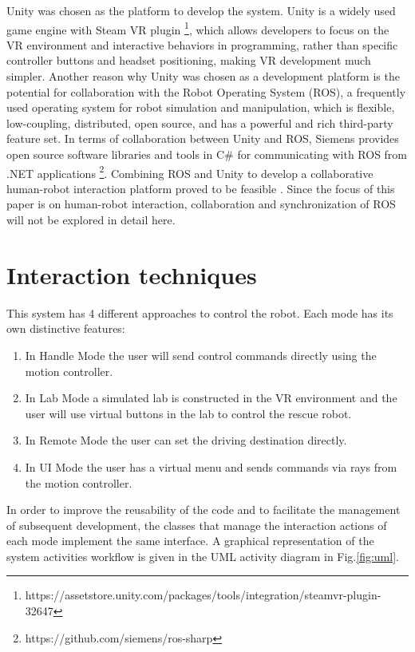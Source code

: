 Unity was chosen as the platform to develop the system. Unity is a widely used game engine with Steam VR plugin \footnote{https://assetstore.unity.com/packages/tools/integration/steamvr-plugin-32647}, which allows developers to focus on the VR environment and interactive behaviors in programming, rather than specific controller buttons and headset positioning, making VR development much simpler. Another reason why Unity was chosen as a development platform is the potential for collaboration with the Robot Operating System (ROS), a frequently used operating system for robot simulation and manipulation, which is flexible, low-coupling, distributed, open source, and has a powerful and rich third-party feature set. In terms of collaboration between Unity and ROS, Siemens provides open source software libraries and tools in C\# for communicating with ROS from .NET applications \footnote{https://github.com/siemens/ros-sharp}. Combining ROS and Unity to develop a collaborative human-robot interaction platform proved to be feasible \cite{Whitney:2018wk}. Since the focus of this paper is on human-robot interaction, collaboration and synchronization of ROS will not be explored in detail here.


\section{Interaction techniques}
This system has 4 different approaches to control the robot. Each mode has its own distinctive features: 

\begin{enumerate}
\item In Handle Mode the user will send control commands directly using the motion controller. 
\item In Lab Mode a simulated lab is constructed in the VR environment and the user will use virtual buttons in the lab to control the rescue robot. 
\item In Remote Mode the user can set the driving destination directly. 
\item In UI Mode the user has a virtual menu and sends commands via rays from the motion controller.
\end{enumerate}

In order to improve the reusability of the code and to facilitate the management of subsequent development, the classes that manage the interaction actions of each mode implement the same interface. A graphical representation of the system activities workﬂow is given in the UML activity diagram in Fig.\ref{fig:uml}.

